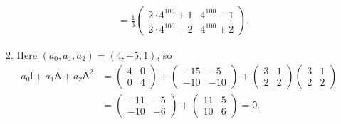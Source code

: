 \begin{enumerate}
\begin{enumerate}
\begin{align*}
&= \frac{1}{3}\begin{pmatrix} 2\cdot 4^{100} + 1 & 4^{100} - 1 \\ 2\cdot 4^{100} -2 & 4^{100} + 2 \end{pmatrix}.
\end{align*}
\item Here $(a_0, a_1, a_2) = (4, -5, 1)$, so
\begin{align*}
a_0\mathsf{I} + a_1\mathsf{A} + a_2\mathsf{A}^2 &= \begin{pmatrix} 4 & 0 \\ 0 & 4 \end{pmatrix} + \begin{pmatrix} -15 & -5 \\ -10 & -10 \end{pmatrix} + \begin{pmatrix} 3 & 1 \\ 2 & 2 \end{pmatrix}\begin{pmatrix} 3 & 1 \\ 2 & 2 \end{pmatrix} \\
&= \begin{pmatrix} -11 & -5 \\ -10 & -6 \end{pmatrix} + \begin{pmatrix} 11 & 5 \\ 10 & 6 \end{pmatrix} = \mathsf{0}.
\end{align*}
\end{enumerate}
\end{enumerate}